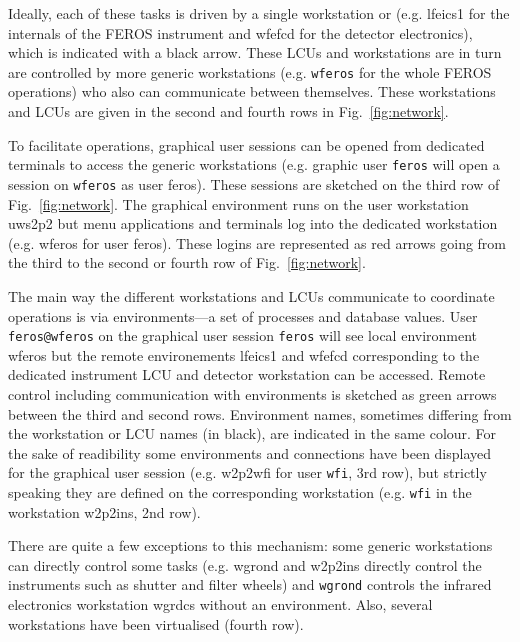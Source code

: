 \documentclass[11pt,fleqn,a4paper]{book}
\begin{document}
Ideally, each of these tasks is driven by a single \gls{workstation} or  (e.g. \gls{lfeics1} for the internals of the FEROS instrument and \gls{wfefcd} for the detector electronics), which is indicated with a black arrow.  These LCUs and workstations are in turn are controlled by more generic workstations (e.g. \texttt{wferos} for the whole FEROS operations) who also can communicate between themselves. These workstations and LCUs are given in the second and fourth rows in Fig.~\ref{fig:network}.  

To facilitate operations, graphical user sessions can be opened from dedicated terminals to access the generic workstations (e.g. graphic user \texttt{feros} will open a session on \texttt{wferos} as user feros).  These sessions are sketched on the third row of Fig.~\ref{fig:network}.  The graphical environment runs on the user workstation \gls{uws2p2} but menu applications and terminals log into the dedicated workstation (e.g. \gls{wferos} for user \gls{feros}). These logins are represented as red arrows going from the third to the second or fourth row of Fig.~\ref{fig:network}.

The main way the different workstations and LCUs communicate to coordinate operations is via \glspl{environment}---a set of processes and database values.  User \texttt{feros@wferos} on the graphical user session \texttt{feros} will see local environment \gls{wferos} but the remote environements \gls{lfeics1} and \gls{wfefcd} corresponding to the dedicated instrument LCU and detector workstation can be accessed.  Remote control including communication with environments is sketched as green arrows between the third and second rows. Environment names, sometimes differing from the workstation or LCU names (in black), are indicated in the same colour.  For the sake of readibility some environments and connections have been displayed for the graphical user session (e.g. \gls{w2p2wfi} for user \texttt{wfi}, 3rd row), but strictly speaking they are defined on the corresponding workstation (e.g. \texttt{wfi} in the workstation \gls{w2p2ins}, 2nd row).

There are quite a few exceptions to this mechanism: some generic workstations can directly control some tasks (e.g. \gls{wgrond} and \gls{w2p2ins} directly control the instruments such as shutter and filter wheels) and \texttt{wgrond} controls the infrared electronics workstation \gls{wgrdcs} without an environment. Also, several workstations have been virtualised (fourth row).
\end{document}
